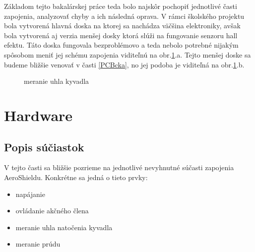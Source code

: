 Základom tejto bakalárskej práce teda bolo najskôr pochopiť jednotlivé časti zapojenia, analyzovať chyby a ich následná oprava. V rámci školského projektu bola vytvorená hlavná doska na ktorej sa nachádza väčšina elektroniky, avšak bola vytvorená aj verzia menšej dosky ktorá slúži na fungovanie senzoru hall efektu. Táto doska fungovala bezproblémovo a teda nebolo potrebné nijakým spôsobom meniť jej schému zapojenia viditeľnú na obr.\ref{OBRAZOK 2.1.2}.a. Tejto menšej doske sa budeme bližšie venovať v časti \ref{PCBcka}, no jej podoba je viditeľná na obr.\ref{OBRAZOK 2.1.2}.b.


\begin{figure}[!tbh]
	\hfill
	\hfill
	\hfill
	\caption{meranie uhla kyvadla}\label{OBRAZOK 2.1.2}
\end{figure}

\vspace{3cm}


\section{Hardware}
\subsection{Popis súčiastok}

V tejto časti sa bližšie pozrieme na jednotlivé nevyhnutné súčasti zapojenia AeroShieldu. Konkrétne sa jedná o tieto prvky:
\begin{multicols}{2}
	\begin{itemize}
		\item napájanie
		\item ovládanie akčného člena
		\item meranie uhla natočenia kyvadla
		\item meranie prúdu
	\end{itemize}
\end{multicols}


